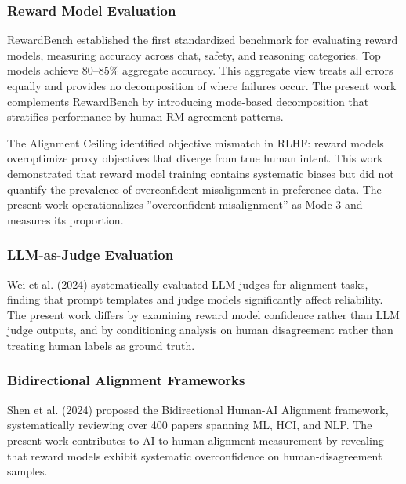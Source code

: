 
\subsubsection{Reward Model Evaluation}

RewardBench \citep{lambert2024rewardbench} established the first standardized benchmark for evaluating reward models, measuring accuracy across chat, safety, and reasoning categories. Top models achieve 80--85\% aggregate accuracy. This aggregate view treats all errors equally and provides no decomposition of where failures occur. The present work complements RewardBench by introducing mode-based decomposition that stratifies performance by human-RM agreement patterns.

The Alignment Ceiling \citep{lambert2023alignmentceiling} identified objective mismatch in RLHF: reward models overoptimize proxy objectives that diverge from true human intent. This work demonstrated that reward model training contains systematic biases but did not quantify the prevalence of overconfident misalignment in preference data. The present work operationalizes ''overconfident misalignment'' as Mode 3 and measures its proportion.

\subsubsection{LLM-as-Judge Evaluation}

Wei et al. (2024) systematically evaluated LLM judges for alignment tasks, finding that prompt templates and judge models significantly affect reliability. The present work differs by examining reward model confidence rather than LLM judge outputs, and by conditioning analysis on human disagreement rather than treating human labels as ground truth.

\subsubsection{Bidirectional Alignment Frameworks}

Shen et al. (2024) proposed the Bidirectional Human-AI Alignment framework, systematically reviewing over 400 papers spanning ML, HCI, and NLP. The present work contributes to AI-to-human alignment measurement by revealing that reward models exhibit systematic overconfidence on human-disagreement samples.
